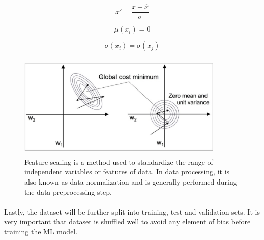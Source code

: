 \documentclass{llncs}       %
\begin{document}
\begin{equation} 
x'=\frac{x-\hat{x}}{\sigma}
\end{equation}

\begin{equation}
\mu (x_{i})= 0   
\end{equation}

\begin{equation} 
\sigma (x_{i}) = \sigma(x_{j})
\end{equation}


\begin{figure}[h]
\centering
\includegraphics[width=9.81cm,height=5.00cm]{media/image7.eps}
\caption{Feature scaling is a method used to standardize the 
range of independent variables or features of data. In data processing, 
it is also known as data normalization and is generally performed during 
the data preprocessing step.}
\end{figure}

\paragraph{}
\paragraph{}
\paragraph{}

Lastly, the dataset will be further split into training, test and validation sets. It is very important that dataset is shuffled well to avoid any element of bias before training the ML model.

\paragraph{}
\paragraph{}
\end{document}
